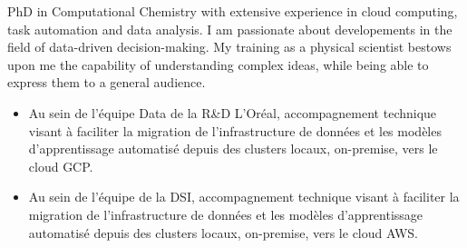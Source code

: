 \documentclass[10pt,a4paper,ragged2e,academicons]{altacv}
\begin{document}

\begin{fullwidth}
\makecvheader
\parbox{.7\paperwidth}{%
PhD in Computational Chemistry with extensive experience in cloud computing, task automation and data analysis. I am passionate about developements in the field of data-driven decision-making. My training as a physical scientist bestows upon me the capability of understanding complex ideas, while being able to express them to a general audience.
}

\end{fullwidth}



\begin{itemize}
\item Au sein de l’équipe Data de la R\&D L’Oréal, accompagnement technique visant à faciliter
la migration de l’infrastructure de données et les modèles d’apprentissage automatisé
depuis des clusters locaux, on-premise, vers le cloud GCP. 
\end{itemize}

\divider

\begin{itemize}
\item Au sein de l’équipe de la DSI, accompagnement technique visant à faciliter la migration
de l’infrastructure de données et les modèles d’apprentissage automatisé depuis des
clusters locaux, on-premise, vers le cloud AWS. 
\end{itemize}
\end{document}
